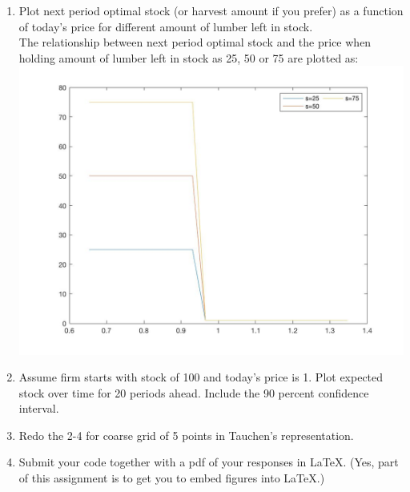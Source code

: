 \documentclass[11pt]{article}
\begin{document}
\begin{enumerate}
\item Plot next period optimal stock (or harvest amount if you prefer) as a function of today's price for different amount of lumber left in stock.\\[2em]

The relationship between next period optimal stock and the price when holding amount of lumber left in stock as 25, 50 or 75 are plotted as:\\
    \includegraphics[scale=0.2]{spolp.jpg}


\item Assume firm starts with stock of 100 and today's price is 1. Plot expected stock over time for 20 periods ahead. Include the 90 percent confidence interval. \\[2em]



\item Redo the 2-4 for coarse grid of 5 points in Tauchen's representation.
\item Submit your code together with a pdf of your responses in \LaTeX. (Yes, part of this assignment is to get you to embed figures into \LaTeX.)
\end{enumerate}
\end{document}
